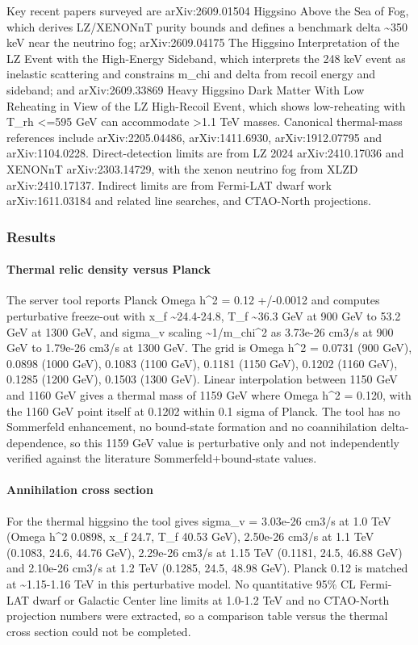 \documentclass[11pt,a4paper]{article}
\begin{document}
Key recent papers surveyed are arXiv:2609.01504 Higgsino Above the Sea of Fog, which derives LZ/XENONnT purity bounds and defines a benchmark delta \textasciitilde{}350 keV near the neutrino fog; arXiv:2609.04175 The Higgsino Interpretation of the LZ Event with the High-Energy Sideband, which interprets the 248 keV event as inelastic scattering and constrains m\_chi and delta from recoil energy and sideband; and arXiv:2609.33869 Heavy Higgsino Dark Matter With Low Reheating in View of the LZ High-Recoil Event, which shows low-reheating with T\_rh \textless{}=595 GeV can accommodate \textgreater{}1.1 TeV masses. Canonical thermal-mass references include arXiv:2205.04486, arXiv:1411.6930, arXiv:1912.07795 and arXiv:1104.0228. Direct-detection limits are from LZ 2024 arXiv:2410.17036 and XENONnT arXiv:2303.14729, with the xenon neutrino fog from XLZD arXiv:2410.17137. Indirect limits are from Fermi-LAT dwarf work arXiv:1611.03184 and related line searches, and CTAO-North projections.

\subsubsection*{Results}
\paragraph{Thermal relic density versus Planck}
The server tool reports Planck Omega h\textasciicircum{}2 = 0.12 +/-0.0012 and computes perturbative freeze-out with x\_f \textasciitilde{}24.4-24.8, T\_f \textasciitilde{}36.3 GeV at 900 GeV to 53.2 GeV at 1300 GeV, and sigma\_v scaling \textasciitilde{}1/m\_chi\textasciicircum{}2 as 3.73e-26 cm3/s at 900 GeV to 1.79e-26 cm3/s at 1300 GeV. The grid is Omega h\textasciicircum{}2 = 0.0731 (900 GeV), 0.0898 (1000 GeV), 0.1083 (1100 GeV), 0.1181 (1150 GeV), 0.1202 (1160 GeV), 0.1285 (1200 GeV), 0.1503 (1300 GeV). Linear interpolation between 1150 GeV and 1160 GeV gives a thermal mass of 1159 GeV where Omega h\textasciicircum{}2 = 0.120, with the 1160 GeV point itself at 0.1202 within 0.1 sigma of Planck. The tool has no Sommerfeld enhancement, no bound-state formation and no coannihilation delta-dependence, so this 1159 GeV value is perturbative only and not independently verified against the literature Sommerfeld+bound-state values.

\paragraph{Annihilation cross section}
For the thermal higgsino the tool gives sigma\_v = 3.03e-26 cm3/s at 1.0 TeV (Omega h\textasciicircum{}2 0.0898, x\_f 24.7, T\_f 40.53 GeV), 2.50e-26 cm3/s at 1.1 TeV (0.1083, 24.6, 44.76 GeV), 2.29e-26 cm3/s at 1.15 TeV (0.1181, 24.5, 46.88 GeV) and 2.10e-26 cm3/s at 1.2 TeV (0.1285, 24.5, 48.98 GeV). Planck 0.12 is matched at \textasciitilde{}1.15-1.16 TeV in this perturbative model. No quantitative 95\% CL Fermi-LAT dwarf or Galactic Center line limits at 1.0-1.2 TeV and no CTAO-North projection numbers were extracted, so a comparison table versus the thermal cross section could not be completed.
\end{document}
